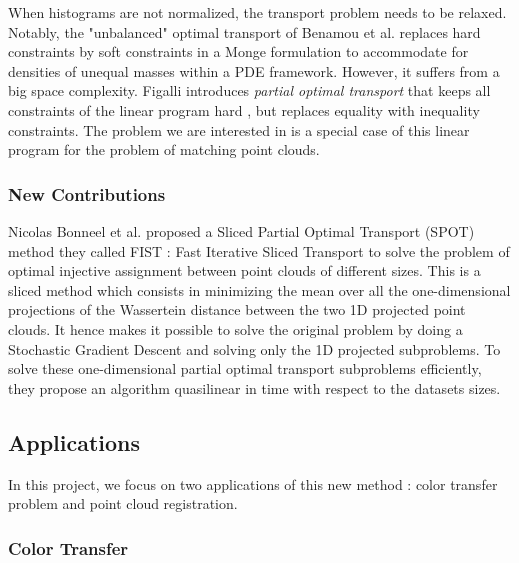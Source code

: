 \documentclass[a4paper,12pt]{article}
\begin{document}
When histograms are not normalized, the transport problem needs to be relaxed. Notably, the "unbalanced" optimal transport of Benamou et al. \cite{benamou2003numerical} replaces hard constraints by soft constraints in a Monge formulation to accommodate for densities of unequal masses within a PDE framework. However, it suffers from a big space complexity. Figalli introduces \textit{partial optimal transport} that keeps all constraints of the linear program hard \cite{figalli2010optimal}, but replaces equality with inequality constraints. The problem we are interested in is a special case of this linear program for the problem of matching point clouds.

\subsubsection*{New Contributions}

Nicolas Bonneel et al. \cite{BC19} proposed a Sliced Partial Optimal Transport (SPOT) method they called FIST : Fast Iterative Sliced Transport to solve the problem of optimal injective assignment between point clouds of different sizes. This is a sliced method which consists in minimizing the mean over all the one-dimensional projections of the Wassertein distance between the two 1D projected point clouds. It hence makes it possible to solve the original problem by doing a Stochastic Gradient Descent and solving only the 1D projected subproblems.
To solve these one-dimensional partial optimal transport subproblems efficiently, they propose an algorithm quasilinear in time with respect to the datasets sizes.

\subsection*{Applications}

In this project, we focus on two applications of this new method : color transfer problem and point cloud registration.

\subsubsection*{Color Transfer}
\end{document}
